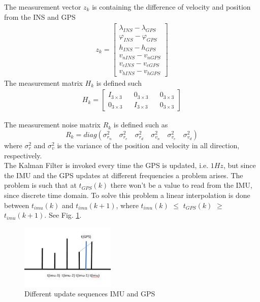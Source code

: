 The measurement vector $z_k$ is containing the difference of velocity and position from the INS and GPS
\begin{align}
z_k =
\begin{bmatrix}
\lambda_{INS} - \lambda_{GPS} \\
\varphi_{INS} - \varphi_{GPS} \\
h_{INS} - h_{GPS} \\
v_{nINS} - v_{nGPS} \\
v_{eINS} - v_{eGPS} \\
v_{hINS} - v_{hGPS}
\end{bmatrix}
\end{align}
The measurement matrix $H_k$ is defined such
\begin{align}
H_k = 
\begin{bmatrix}
I_{3\times 3} && 0_{3 \times 3} && 0_{3 \times 3} \\
0_{3 \times 3} && I_{3\times 3} && 0_{3 \times 3}
\end{bmatrix}
\end{align}

The measurement noise matrix $R_k$ is defined such as 
\begin{equation}
R_k = diag(\sigma_{r_n}^2 \quad \sigma_{r_e}^2 \quad \sigma_{r_d}^2 \quad \sigma_{v_n}^2 \quad \sigma_{v_e}^2 \quad \sigma_{v_d}^2)
\end{equation}
where $\sigma_{r}^2$ and $\sigma_{v}^2$ is the variance of the position and velocity in all direction, respectively.\\

The Kalman Filter is invoked every time the GPS is updated, i.e. $1Hz$, but since the IMU and the GPS updates at different frequencies a problem arises. The problem is such that at $t_{GPS}(k)$ there won't be a value to read from the IMU, since discrete time domain. To solve this problem a linear interpolation is done between $t_{imu}(k)$ and $t_{imu}(k+1)$, where $t_{imu}(k)$ $\leq$ $t_{GPS}(k)$ $\geq$  $t_{imu}(k+1)$. See Fig. \ref{Fig.different_update}.
\begin{figure}[H]
\centering
\includegraphics[width=0.4\textwidth]{Figures/linear.JPG}
\caption{Different update sequences IMU and GPS}
\label{Fig.different_update}
\end{figure}

